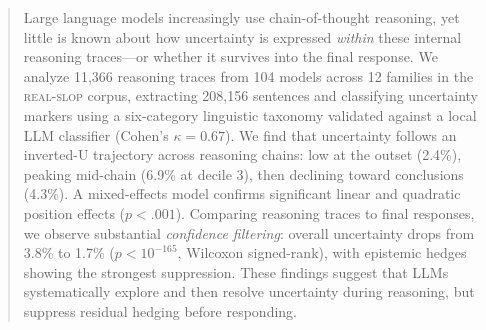 \begin{abstract}
Large language models increasingly use chain-of-thought reasoning, yet little is known about how uncertainty is expressed \emph{within} these internal reasoning traces---or whether it survives into the final response.
We analyze 11,366 reasoning traces from 104 models across 12 families in the \textsc{real-slop} corpus, extracting 208,156 sentences and classifying uncertainty markers using a six-category linguistic taxonomy validated against a local LLM classifier (Cohen's $\kappa = 0.67$).
We find that uncertainty follows an inverted-U trajectory across reasoning chains: low at the outset (2.4\%), peaking mid-chain (6.9\% at decile 3), then declining toward conclusions (4.3\%).
A mixed-effects model confirms significant linear and quadratic position effects ($p < .001$).
Comparing reasoning traces to final responses, we observe substantial \emph{confidence filtering}: overall uncertainty drops from 3.8\% to 1.7\% ($p < 10^{-165}$, Wilcoxon signed-rank), with epistemic hedges showing the strongest suppression.
These findings suggest that LLMs systematically explore and then resolve uncertainty during reasoning, but suppress residual hedging before responding.
\end{abstract}
